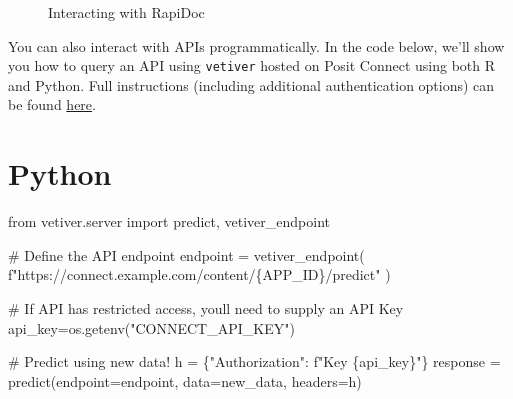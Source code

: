 \documentclass[
  letterpaper,
  DIV=11,
  numbers=noendperiod]{scrreprt}
\newenvironment{Shaded}{\begin{snugshade}}{\end{snugshade}}
\newcommand{\CommentTok}[1]{\textcolor[rgb]{0.37,0.37,0.37}{#1}}
\newcommand{\ImportTok}[1]{\textcolor[rgb]{0.00,0.46,0.62}{#1}}
\newcommand{\NormalTok}[1]{\textcolor[rgb]{0.00,0.23,0.31}{#1}}
\newcommand{\OperatorTok}[1]{\textcolor[rgb]{0.37,0.37,0.37}{#1}}
\newcommand{\SpecialCharTok}[1]{\textcolor[rgb]{0.37,0.37,0.37}{#1}}
\newcommand{\SpecialStringTok}[1]{\textcolor[rgb]{0.13,0.47,0.30}{#1}}
\newcommand{\StringTok}[1]{\textcolor[rgb]{0.13,0.47,0.30}{#1}}
\begin{document}
\begin{figure}


\caption{\label{fig-rapidoc-response}Interacting with RapiDoc}

\end{figure}%

You can also interact with APIs programmatically. In the code below,
we'll show you how to query an API using \texttt{vetiver} hosted on
Posit Connect using both R and Python. Full instructions (including
additional authentication options) can be found
\href{https://docs.posit.co/connect/user/vetiver/}{here}.

\section{Python}

\begin{Shaded}
\begin{Highlighting}[]
\ImportTok{from}\NormalTok{ vetiver.server }\ImportTok{import}\NormalTok{ predict, vetiver\_endpoint}

\CommentTok{\# Define the API endpoint}
\NormalTok{endpoint }\OperatorTok{=}\NormalTok{ vetiver\_endpoint(}
    \SpecialStringTok{f"https://connect.example.com/content/}\SpecialCharTok{\{}\NormalTok{APP\_ID}\SpecialCharTok{\}}\SpecialStringTok{/predict"}
\NormalTok{)}

\CommentTok{\# If API has restricted access, you\textquotesingle{}ll need to supply an API Key}
\NormalTok{api\_key}\OperatorTok{=}\NormalTok{os.getenv(}\StringTok{"CONNECT\_API\_KEY"}\NormalTok{)}

\CommentTok{\# Predict using new data!}
\NormalTok{h }\OperatorTok{=}\NormalTok{ \{}\StringTok{"Authorization"}\NormalTok{: }\SpecialStringTok{f"Key }\SpecialCharTok{\{}\NormalTok{api\_key}\SpecialCharTok{\}}\SpecialStringTok{"}\NormalTok{\}}
\NormalTok{response }\OperatorTok{=}\NormalTok{ predict(endpoint}\OperatorTok{=}\NormalTok{endpoint, data}\OperatorTok{=}\NormalTok{new\_data, headers}\OperatorTok{=}\NormalTok{h)}
\end{Highlighting}
\end{Shaded}
\end{document}
